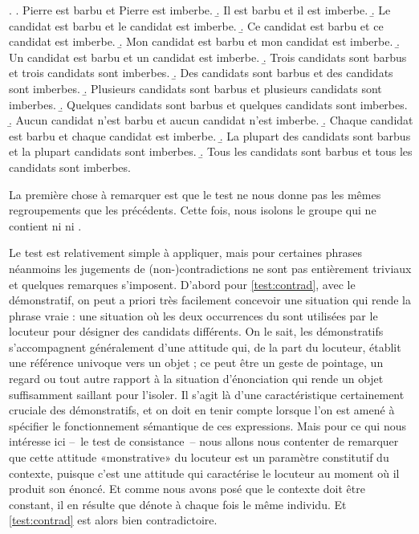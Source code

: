 \ex. \label{test:contra}
\a. \juge{${}^{\bot}$} Pierre est barbu et Pierre est imberbe.
\b. \juge{${}^{\bot}$} Il est barbu et il est imberbe.
\b. \juge{${}^{\bot}$} Le candidat est barbu et le candidat est imberbe.
\b. \juge{${}^{\bot}$} Ce candidat est barbu et ce candidat est imberbe.\label{test:contrad}
\b. \juge{${}^{\bot}$} Mon candidat est barbu et mon candidat est imberbe.
\b. Un candidat est barbu et un candidat est imberbe.
\b. Trois candidats sont barbus et trois candidats sont imberbes.
\b. Des candidats sont barbus et des candidats sont imberbes.
\b. Plusieurs candidats sont barbus et plusieurs candidats sont imberbes.
\b. Quelques candidats sont barbus et quelques candidats sont imberbes.
\b. %
Aucun candidat n'est barbu et aucun candidat n'est imberbe.\label{test:contral}
\b. \juge{${}^{\bot}$} Chaque candidat est barbu et chaque candidat est imberbe.
\b. \juge{${}^{\bot}$} La plupart des candidats sont barbus et la plupart candidats sont imberbes.
\b. \juge{${}^{\bot}$} Tous les candidats sont barbus et tous les candidats sont imberbes.


La première chose à remarquer est que le test ne nous donne pas les mêmes regroupements que les précédents. Cette fois, nous isolons le groupe \Last[f--k]
qui ne contient ni  ni .  

Le test est relativement simple à appliquer, mais pour certaines phrases néanmoins les jugements de (non-)contradictions ne sont pas entièrement triviaux et quelques remarques s'imposent. 
D'abord pour \ref{test:contrad}, avec le démonstratif, on peut a priori très facilement concevoir une situation qui rende la phrase vraie : une situation où les deux occurrences du {\GN}  sont utilisées par le locuteur pour désigner des candidats différents.  On le sait, les {\GN} démonstratifs s'accompagnent généralement d'une attitude qui, de la part du locuteur, établit une référence univoque vers un objet ; ce peut être un geste de pointage, un regard ou tout autre rapport à la situation d'énonciation qui rende un objet suffisamment saillant pour l'isoler. Il s'agit là d'une caractéristique certainement cruciale des démonstratifs, et on doit en tenir compte lorsque l'on est amené à spécifier le fonctionnement sémantique de ces expressions. Mais pour ce qui nous intéresse ici --~le test de consistance~-- nous allons nous contenter de remarquer que cette attitude «monstrative» du locuteur est un paramètre constitutif du contexte, puisque c'est une attitude qui caractérise le locuteur au moment où il produit son énoncé.  Et comme nous avons posé que le contexte doit être constant, il en résulte que  dénote à chaque fois le même individu. 
Et \ref{test:contrad} est alors bien contradictoire.

